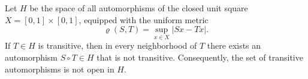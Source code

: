Let $H$ be the space of all automorphisms of the closed unit square $X = [0,1] \times [0,1]$, equipped with the uniform metric
$$\varrho(S, T) = \sup_{x \in X} |Sx - Tx|.$$
If $T \in H$ is transitive, then in every neighborhood of $T$ there exists an automorphism $S \circ T \in H$ that is not transitive. Consequently, the set of transitive automorphisms is not open in $H$.
